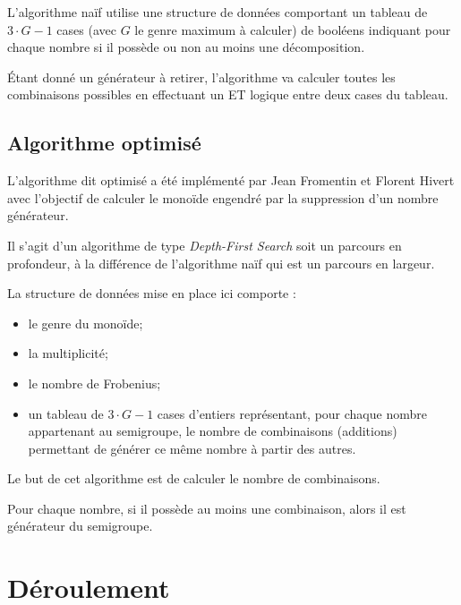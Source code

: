 \documentclass[12pt,a4paper]{article}
\begin{document}
L'algorithme naïf utilise une structure de données comportant un tableau de $3 \cdot G - 1$ cases (avec $G$ le genre maximum à calculer) de booléens indiquant pour chaque nombre si il possède ou non au moins une décomposition.

Étant donné un générateur à retirer, l'algorithme va calculer toutes les combinaisons possibles en effectuant un ET logique entre deux cases du tableau. 

\subsection*{Algorithme optimisé}

L'algorithme dit optimisé a été implémenté par Jean Fromentin et Florent Hivert avec l'objectif de calculer le monoïde engendré par la suppression d'un nombre générateur.

Il s'agit d'un algorithme de type \emph{Depth-First Search} soit un parcours en profondeur, à la différence de l'algorithme naïf qui est un parcours en largeur.

La structure de données mise en place ici comporte :
\begin{itemize}
	\item	le genre du monoïde;
	\item	la multiplicité;
	\item	le nombre de Frobenius;
	\item	un tableau de $3 \cdot G - 1$ cases d'entiers représentant, pour chaque nombre appartenant au semigroupe, le nombre de combinaisons (additions) permettant de générer ce même nombre à partir des autres.
\end{itemize}

Le but de cet algorithme est de calculer le nombre de combinaisons.

Pour chaque nombre, si il possède au moins une combinaison, alors il est générateur du semigroupe.

\section*{Déroulement}
\end{document}
